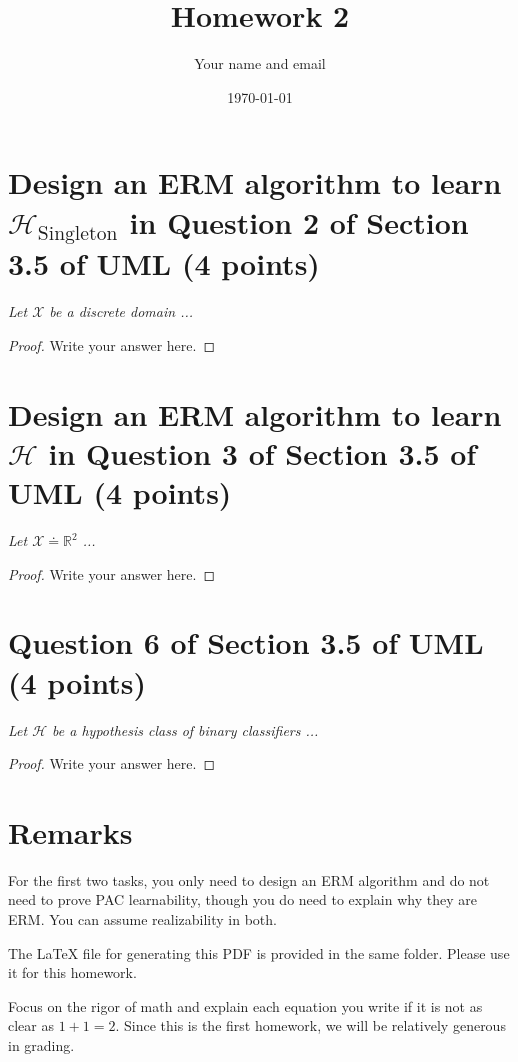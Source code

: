 \documentclass{article}
\title{Homework 2}
\author{Your name and email}
\date{\today}
\begin{document}
\maketitle

\section{Design an ERM algorithm to learn $\mathcal{H}_\text{Singleton}$ in Question 2 of Section 3.5 of UML (4 points)}
\emph{Let $\mathcal{X}$ be a discrete domain ...}
\begin{proof}
    Write your answer here.
\end{proof}
\section{Design an ERM algorithm to learn $\mathcal{H}$ in Question 3 of Section 3.5 of UML (4 points)}
\emph{Let $\mathcal{X} \doteq \mathbb{R}^2$ ...}
\begin{proof}
    Write your answer here.
\end{proof}
\section{Question 6 of Section 3.5 of UML (4 points)}
\emph{Let $\mathcal{H}$ be a hypothesis class of binary classifiers ...}
\begin{proof}
    Write your answer here.
\end{proof}

\section{Remarks}
For the first two tasks, you only need to design an ERM algorithm and do not need to prove PAC learnability,
though you do need to explain why they are ERM.
You can assume realizability in both.

The \LaTeX{} file for generating this PDF is provided in the same folder. 
Please use it for this homework.

Focus on the rigor of math and explain each equation you write if it is not as clear as $1+1 = 2$.
Since this is the first homework,
we will be relatively generous in grading.
\end{document}
